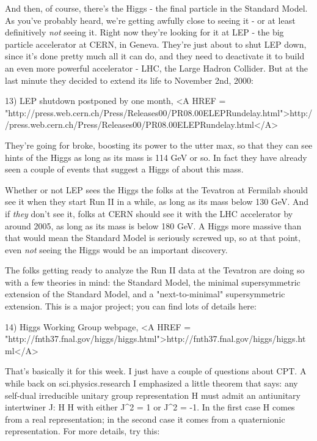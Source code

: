 And then, of course, there's the Higgs - the final particle in the
Standard Model.  As you've probably heard, we're getting awfully close
to seeing it - or at least definitively \emph{not} seeing it.   Right now
they're looking for it at LEP - the big particle accelerator at
CERN, in Geneva.  They're just about to shut LEP down, since it's 
done pretty much all it can do, and they need to deactivate it to 
build an even more powerful accelerator - LHC, the Large Hadron  
Collider.  But at the last minute they decided to extend its life 
to November 2nd, 2000:

13) LEP shutdown postponed by one month, 
<A HREF = "http://press.web.cern.ch/Press/Releases00/PR08.00ELEPRundelay.html">http://press.web.cern.ch/Press/Releases00/PR08.00ELEPRundelay.html</A>

They're going for broke, boosting its power to the utter max, so 
that they can see hints of the Higgs as long as its mass is 114
GeV or so.  In fact they have already seen a couple of events that
suggest a Higgs of about this mass.  

Whether or not LEP sees the Higgs the folks at the Tevatron at Fermilab
should see it when they start Run II in a while, as long as its mass
below 130 GeV.  And if \emph{they} don't see it, folks at CERN should see it
with the LHC accelerator by around 2005, as long as its mass is below
180 GeV.  A Higgs more massive than that would mean the Standard Model
is seriously screwed up, so at that point, even \emph{not} seeing the Higgs
would be an important discovery.

The folks getting ready to analyze the Run II data at the Tevatron are
doing so with a few theories in mind: the Standard Model, the minimal
supersymmetric extension of the Standard Model, and a "next-to-minimal"
supersymmetric extension.  This is a major project; you can find lots
of details here:

14) Higgs Working Group webpage, <A HREF = "http://fnth37.fnal.gov/higgs/higgs.html">http://fnth37.fnal.gov/higgs/higgs.html</A>


That's basically it for this week.  I just have a couple of
questions about CPT.  A while back on sci.physics.research I emphasized
a little theorem that says: any self-dual irreducible unitary group
representation H must admit an antiunitary intertwiner J: H \to  H with
either J^{2} = 1 or J^{2} = -1.  In the first case H
comes from a real representation; in the second case it comes from a
quaternionic representation.  For more details, try this:

